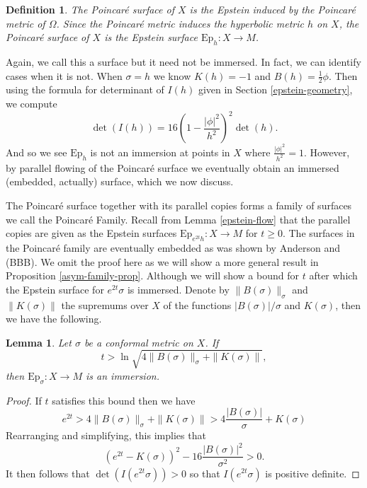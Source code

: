 \documentclass{amsart}
\newtheorem{lem}[thm]{Lemma}
\newtheorem{defn}{Definition}
\begin{document}
\begin{defn}
The Poincar\'e surface of $X$ is the Epstein induced by the Poincar\'e metric of $\Omega$. 
Since the Poincar\'e metric induces the hyperbolic metric $h$ on $X$, the Poincar\'e surface of $X$ is the Epstein surface $\mathrm{Ep}_h: X \to M$.
\end{defn}


Again, we call this a surface but it need not be immersed. 
In fact, we can identify cases when it is not. 
When $\sigma = h$ we know $K(h) = -1$ and $B(h) = \frac{1}{2}\phi$. 
Then using the formula for determinant of $I(h)$ given in Section \ref{epstein-geometry}, we compute
\[
\det(I(h)) = 16 \left( 1 - \frac{|\phi|^2}{h^2} \right)^2 \det(h).
\]
And so we see $\mathrm{Ep}_h$ is not an immersion at points in $X$ where $\frac{|\phi|^2}{h^2} =1$. 
However, by parallel flowing of the Poincar\'e surface we eventually obtain an immersed (embedded, actually) surface, which we now discuss. 


The Poincar\'e surface together with its parallel copies forms a family of surfaces we call the Poincar\'e Family. 
Recall from Lemma \ref{epstein-flow} that the parallel copies are given as the Epstein surfaces $\mathrm{Ep}_{e^{2t}h}: X \to M$ for $t \geq 0$. 
The surfaces in the Poincar\'e family are eventually embedded as was shown by Anderson\cite{anderson1998} and \cite{bromgerg-brock-bridgeman2019}(BBB). 
We omit the proof here as we will show a more general result in Proposition \ref{asym-family-prop}. 
Although we will show a bound for $t$ after which the Epstein surface for $e^{2t}\sigma$ is immersed. 
Denote by $\|B(\sigma)\|_\sigma$ and $\|K(\sigma)\|$ the supremums over $X$ of the functions $|B(\sigma)|/\sigma$ and $K(\sigma)$, then we have the following.

\begin{lem}\label{parallel-family-immersed}
Let $\sigma$ be a conformal metric on $X$. 
If 
\[
t > \ln  \sqrt{ 4 \|B(\sigma)\|_\sigma + \|K(\sigma)\|},
\]
then $\mathrm{Ep}_\sigma: X \to M$ is an immersion.
\end{lem}

\begin{proof}
If $t$ satisfies this bound then we have
\[
e^{2t} > 4 \|B(\sigma)\|_\sigma + \|K(\sigma)\| > 4 \frac{|B(\sigma)|}{\sigma} + K(\sigma)
\]
Rearranging and simplifying, this implies that 
\[
(e^{2t} - K(\sigma))^2 - 16\frac{|B(\sigma)|^2}{\sigma^2} > 0.
\]
It then follows that $\det(I(e^{2t}\sigma)) > 0$ so that $I(e^{2t}\sigma)$ is positive definite. 
\end{proof}
\end{document}
